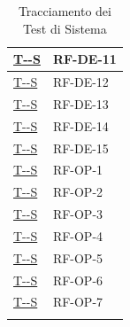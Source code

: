 \documentclass[a4paper,12pt]{article}
\newcounter{testsys}
\newcommand{\systestref}{%
  \hyperlink{T-\arabic{testsys}-S}{T-\arabic{testsys}-S}%
}
\begin{document}
\begin{longtable}{|>{\centering\arraybackslash}p{5cm}|>{\centering\arraybackslash}p{9cm}|}
\stepcounter{testsys}
\systestref & RF-DE-11 \\
\hline

\stepcounter{testsys}
\systestref & RF-DE-12 \\
\hline

\stepcounter{testsys}
\systestref & RF-DE-13 \\
\hline

\stepcounter{testsys}
\systestref & RF-DE-14 \\
\hline

\stepcounter{testsys}
\systestref & RF-DE-15 \\
\hline

\stepcounter{testsys}
\systestref & RF-OP-1 \\
\hline

\stepcounter{testsys}
\systestref & RF-OP-2 \\
\hline

\stepcounter{testsys}
\systestref & RF-OP-3 \\
\hline

\stepcounter{testsys}
\systestref & RF-OP-4 \\
\hline

\stepcounter{testsys}
\systestref & RF-OP-5 \\
\hline

\stepcounter{testsys}
\systestref & RF-OP-6 \\
\hline

\stepcounter{testsys}
\systestref & RF-OP-7 \\
\hline
\rowcolor{white}
\caption{Tracciamento dei Test di Sistema} \label{tab:tracciamento_test_sistema} \\
\end{longtable}
\endgroup

\begingroup
\end{document}
